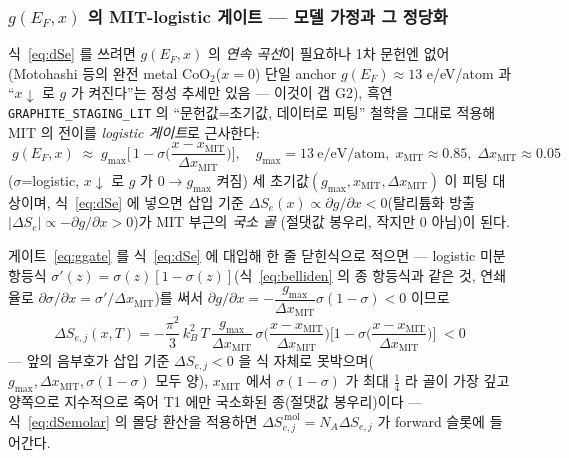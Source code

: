 \documentclass[11pt,a4paper]{article}
\newcommand{\code}[1]{\texttt{#1}}
\begin{document}
\subsubsection{$g(E_F,x)$ 의 MIT-logistic 게이트 — 모델 가정과 그 정당화}\label{sec:lco-gate}
식~\eqref{eq:dSe} 를 쓰려면 $g(E_F,x)$ 의 \emph{연속 곡선}이 필요하나 1차 문헌엔 없어(Motohashi
등\cite{motohashi2009}의 완전 metal $\mathrm{CoO_2}$($x{=}0$) 단일 anchor $g(E_F)\!\approx\!13$ e/eV/atom 과
``$x\!\downarrow$ 로 $g$ 가 켜진다''는 정성 추세만 있음 — 이것이 갭 G2), 흑연 \code{GRAPHITE\_STAGING\_LIT} 의
``문헌값=초기값, 데이터로 피팅'' 철학을 그대로 적용해 MIT 의 전이를 \emph{logistic 게이트}로 근사한다:
\begin{equation}
\boxed{\;g(E_F,x)\;\approx\;g_{\max}\Big[\,1-\sigma\!\Big(\frac{x-x_\mathrm{MIT}}{\Delta x_\mathrm{MIT}}\Big)\Big],
\quad g_{\max}=13\ \text{e/eV/atom},\;x_\mathrm{MIT}\approx0.85,\;\Delta x_\mathrm{MIT}\approx0.05\;}
\label{eq:ggate}
\end{equation}
($\sigma$=logistic, $x\!\downarrow$ 로 $g$ 가 $0\!\to\!g_{\max}$ 켜짐) 세 초기값$(g_{\max},x_\mathrm{MIT},
\Delta x_\mathrm{MIT})$ 이 피팅 대상이며, 식~\eqref{eq:dSe} 에 넣으면 삽입 기준 $\Delta S_e(x)\propto\partial g
/\partial x<0$(탈리튬화 방출 $|\Delta S_e|\propto-\partial g/\partial x>0$)가 MIT 부근의 \emph{국소 골}
(절댓값 봉우리, 작지만 0 아님)이 된다.

게이트~\eqref{eq:ggate} 를 식~\eqref{eq:dSe} 에 대입해 한 줄 닫힌식으로 적으면 — logistic 미분 항등식
$\sigma'(z)=\sigma(z)[1-\sigma(z)]$(식~\eqref{eq:belliden} 의 종 항등식과 같은 것, 연쇄율로
$\partial\sigma/\partial x=\sigma'/\Delta x_\mathrm{MIT}$)를 써서 $\partial g/\partial x=-\dfrac{g_{\max}}{\Delta x_\mathrm{MIT}}
\sigma(1-\sigma)<0$ 이므로
\begin{equation}
\boxed{\;\Delta S_{e,j}(x,T)
=-\frac{\pi^2}{3}\,k_B^2\,T\,\frac{g_{\max}}{\Delta x_\mathrm{MIT}}\,
\sigma\!\Big(\frac{x-x_\mathrm{MIT}}{\Delta x_\mathrm{MIT}}\Big)
\Big[1-\sigma\!\Big(\frac{x-x_\mathrm{MIT}}{\Delta x_\mathrm{MIT}}\Big)\Big]\;<0\;}
\label{eq:dSegate}
\end{equation}
— 앞의 음부호가 삽입 기준 $\Delta S_{e,j}<0$ 을 식 자체로 못박으며($g_{\max},\Delta x_\mathrm{MIT},
\sigma(1-\sigma)$ 모두 양), $x_\mathrm{MIT}$ 에서 $\sigma(1-\sigma)$ 가 최대 $\tfrac14$ 라 골이 가장 깊고 양쪽으로
지수적으로 죽어 T1 에만 국소화된 종(절댓값 봉우리)이다 — 식~\eqref{eq:dSemolar} 의 몰당 환산을 적용하면
$\Delta S_{e,j}^{\,\mathrm{mol}}=N_A\Delta S_{e,j}$ 가 forward 슬롯에 들어간다.
\end{document}
